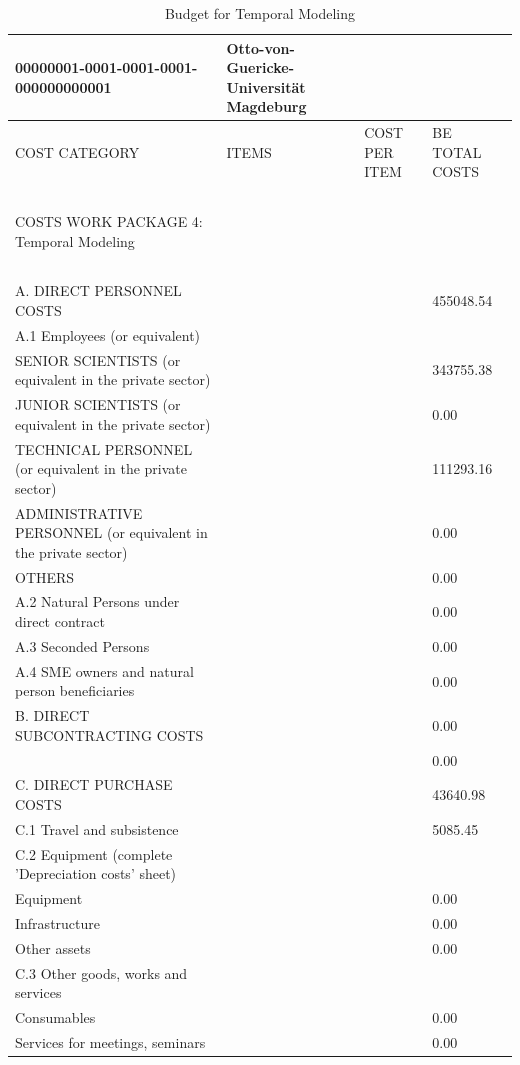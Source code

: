 \begin{table}[H]
\centering
\caption{Budget for Temporal Modeling}
\begin{tabular}{|l|l|l|l|}
\hline
00000001-0001-0001-0001-000000000001 & Otto-von-Guericke-Universität Magdeburg & ~ & ~ \\ \hline
COST CATEGORY & ITEMS & COST PER ITEM & BE TOTAL COSTS \\ \hline
~ & ~ & ~ & ~ \\ \hline
COSTS WORK PACKAGE 4: Temporal Modeling & ~ & ~ & ~ \\ \hline
~ & ~ & ~ & ~ \\ \hline
A. DIRECT PERSONNEL COSTS & ~ & ~ & 455048.54 \\ \hline
A.1 Employees (or equivalent) & ~ & ~ & ~ \\ \hline
SENIOR SCIENTISTS (or equivalent in the private sector) & ~ & ~ & 343755.38 \\ \hline
JUNIOR SCIENTISTS (or equivalent in the private sector) & ~ & ~ & 0.00 \\ \hline
TECHNICAL PERSONNEL (or equivalent in the private sector) & ~ & ~ & 111293.16 \\ \hline
ADMINISTRATIVE PERSONNEL (or equivalent in the private sector) & ~ & ~ & 0.00 \\ \hline
OTHERS & ~ & ~ & 0.00 \\ \hline
A.2 Natural Persons under direct contract & ~ & ~ & 0.00 \\ \hline
A.3 Seconded Persons & ~ & ~ & 0.00 \\ \hline
A.4 SME owners and natural person beneficiaries & ~ &  & 0.00 \\ \hline
B. DIRECT SUBCONTRACTING COSTS & ~ & ~ & 0.00\\ \hline
~ & ~ & ~ & 0.00 \\ \hline
C. DIRECT PURCHASE COSTS & ~ & ~ & 43640.98 \\ \hline
C.1 Travel and subsistence & ~ &  & 5085.45 \\ \hline
C.2 Equipment (complete 'Depreciation costs' sheet) & ~ & ~ & ~ \\ \hline
Equipment & ~ &  & 0.00 \\ \hline
Infrastructure & ~ &  & 0.00 \\ \hline
Other assets & ~ &  & 0.00 \\ \hline
C.3 Other goods, works and services & ~ & ~ & ~ \\ \hline
Consumables & ~ &  & 0.00 \\ \hline
Services for meetings, seminars & ~ & ~ & 0.00 \\ \hline

\end{tabular}
\end{table}

